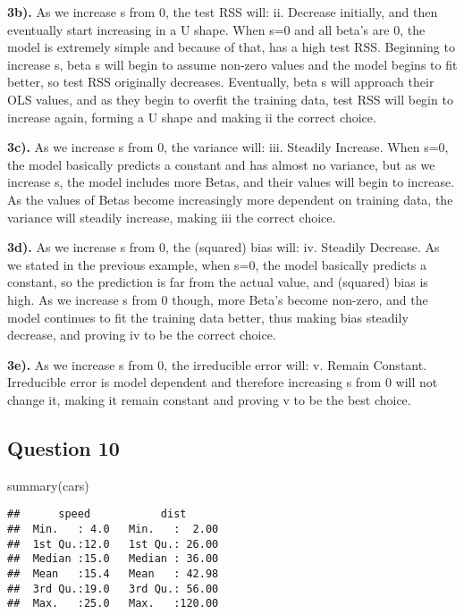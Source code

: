 \documentclass[
]{article}
\newenvironment{Shaded}{\begin{snugshade}}{\end{snugshade}}
\newcommand{\FunctionTok}[1]{\textcolor[rgb]{0.00,0.00,0.00}{#1}}
\newcommand{\NormalTok}[1]{#1}
\begin{document}
\textbf{3b).} As we increase s from 0, the test RSS will: ii. Decrease
initially, and then eventually start increasing in a U shape. When s=0
and all beta's are 0, the model is extremely simple and because of that,
has a high test RSS. Beginning to increase s, beta s will begin to
assume non-zero values and the model begins to fit better, so test RSS
originally decreases. Eventually, beta s will approach their OLS values,
and as they begin to overfit the training data, test RSS will begin to
increase again, forming a U shape and making ii the correct choice.

\textbf{3c).} As we increase s from 0, the variance will: iii. Steadily
Increase. When s=0, the model basically predicts a constant and has
almost no variance, but as we increase s, the model includes more Betas,
and their values will begin to increase. As the values of Betas become
increasingly more dependent on training data, the variance will steadily
increase, making iii the correct choice.

\textbf{3d).} As we increase s from 0, the (squared) bias will: iv.
Steadily Decrease. As we stated in the previous example, when s=0, the
model basically predicts a constant, so the prediction is far from the
actual value, and (squared) bias is high. As we increase s from 0
though, more Beta's become non-zero, and the model continues to fit the
training data better, thus making bias steadily decrease, and proving iv
to be the correct choice.

\textbf{3e).} As we increase s from 0, the irreducible error will: v.
Remain Constant. Irreducible error is model dependent and therefore
increasing s from 0 will not change it, making it remain constant and
proving v to be the best choice.

\hypertarget{question-10}{%
\subsection{Question 10}\label{question-10}}

\begin{Shaded}
\begin{Highlighting}[]
\FunctionTok{summary}\NormalTok{(cars)}
\end{Highlighting}
\end{Shaded}

\begin{verbatim}
##      speed           dist       
##  Min.   : 4.0   Min.   :  2.00  
##  1st Qu.:12.0   1st Qu.: 26.00  
##  Median :15.0   Median : 36.00  
##  Mean   :15.4   Mean   : 42.98  
##  3rd Qu.:19.0   3rd Qu.: 56.00  
##  Max.   :25.0   Max.   :120.00
\end{verbatim}
\end{document}
